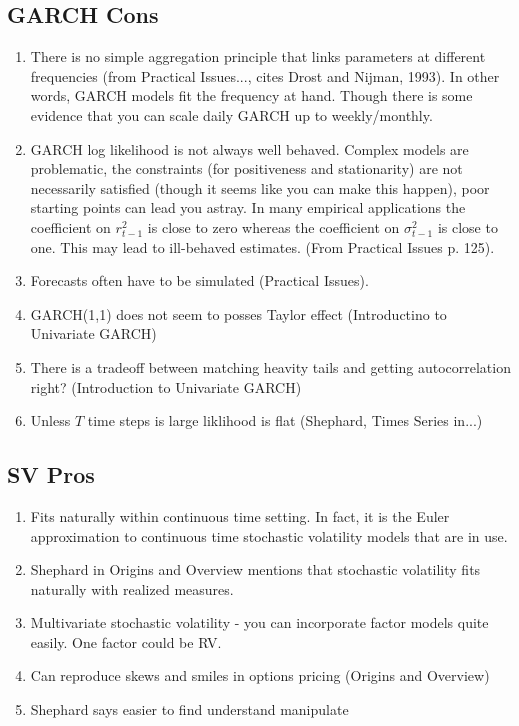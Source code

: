 \documentclass{article}
\begin{document}
\subsection{GARCH Cons}
\begin{enumerate}
\item There is no simple aggregation principle that links parameters at different frequencies (from Practical Issues..., cites Drost and Nijman, 1993).  In other words, GARCH models fit the frequency at hand.  Though there is some evidence that you can scale daily GARCH up to weekly/monthly.
\item GARCH log likelihood is not always well behaved.  Complex models are problematic, the constraints (for positiveness and stationarity) are not necessarily satisfied (though it seems like you can make this happen), poor starting points can lead you astray.  In many empirical applications the coefficient on $r_{t-1}^2$ is close to zero whereas the coefficient on $\sigma_{t-1}^2$ is close to one.  This may lead to ill-behaved estimates.  (From Practical Issues p. 125).
\item Forecasts often have to be simulated (Practical Issues).
\item GARCH(1,1) does not seem to posses Taylor effect (Introductino to Univariate GARCH)
\item There is a tradeoff between matching heavity tails and getting autocorrelation right?  (Introduction to Univariate GARCH)
\item Unless $T$ time steps is large liklihood is flat (Shephard, Times Series in...)
\end{enumerate}

\subsection{SV Pros}
\begin{enumerate}
\item Fits naturally within continuous time setting.  In fact, it is the Euler approximation to continuous time stochastic volatility models that are in use.
\item Shephard in Origins and Overview mentions that stochastic volatility fits naturally with realized measures.
\item Multivariate stochastic volatility - you can incorporate factor models quite easily.  One factor could be RV.
\item Can reproduce skews and smiles in options pricing (Origins and Overview)
\item Shephard says easier to find understand manipulate
\end{enumerate}
\end{document}
